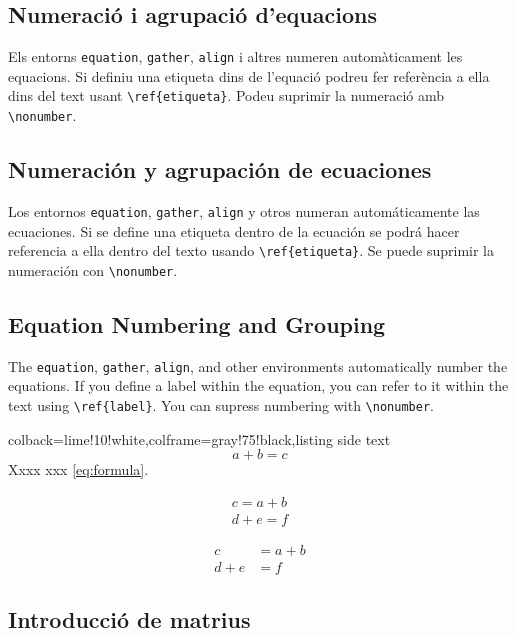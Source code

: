 \ifcase\doclanguage\or
  \subsection{Numeració i agrupació d'equacions}
  Els entorns \texttt{equation}, \texttt{gather}, \texttt{align} i altres numeren automàticament les equacions. Si definiu una etiqueta dins de l'equació podreu fer referència a ella dins del text usant \verb|\ref{etiqueta}|. Podeu suprimir la numeració amb \verb|\nonumber|.
\or
  \subsection{Numeración y agrupación de ecuaciones}
  Los entornos \texttt{equation}, \texttt{gather}, \texttt{align} y otros numeran automáticamente las ecuaciones. Si se define una etiqueta dentro de la ecuación se podrá hacer referencia a ella dentro del texto usando \verb|\ref{etiqueta}|. Se puede suprimir la numeración con \verb|\nonumber|.
\else
  \subsection{Equation Numbering and Grouping}
  The \texttt{equation}, \texttt{gather}, \texttt{align}, and other environments automatically number the equations. If you define a label within the equation, you can refer to it within the text using \verb|\ref{label}|. You can supress numbering with \verb|\nonumber|.
\fi

\begin{tcblisting}{colback=lime!10!white,colframe=gray!75!black,listing side text}
\begin{equation}
  a + b = c   \label{eq:formula}
\end{equation}
Xxxx xxx \ref{eq:formula}.

\begin{gather}
  c = a + b \\
  d + e = f   \nonumber
\end{gather}

\begin{align}
  c &= a + b \nonumber \\
  d + e &= f
\end{align}
\end{tcblisting}


\ifcase\doclanguage\or
  \subsection{Introducció de matrius}
\or
